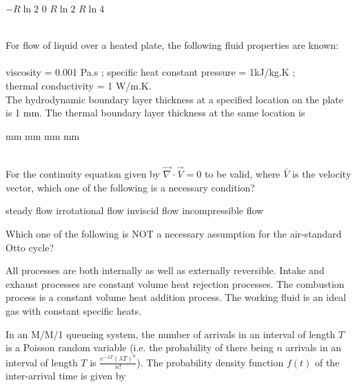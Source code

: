 \documentclass[addpoints,11pt]{exam}
\begin{document}
\begin{questions}
    \begin{oneparchoices}
        \choice $-R \ln2$
        \choice $0$
        \choice $R \ln 2$
        \choice $R\ln4$
    \end{oneparchoices}\\

    \question For flow of liquid over a heated plate, the following fluid properties are known:\\\\
    viscosity = 0.001 Pa.s ; specific heat constant pressure = 1kJ/kg.K ;\\
    thermal conductivity = 1 W/m.K.\\
    The hydrodynamic boundary layer thickness at a specified location on the plate is 1 mm. The thermal boundary layer thickness at the same location is

    \begin{oneparchoices}
         mm
         mm
         mm
         mm
    \end{oneparchoices}\\

    \question For the continuity equation given by $\overrightarrow{\nabla}\cdot\overrightarrow{V} = 0$ to be valid, where $\bar{V}$ is the velocity vector, which one of the following is a necessary condition?\\

    \begin{choices}
        \choice steady flow
        \choice irrotational flow
        \choice inviscid flow
        \choice incompressible flow
    \end{choices}

    \question Which one of the following is NOT a necessary assumption for the air-standard Otto cycle?\\

    \begin{choices}
        \choice All processes are both internally as well as externally reversible.
        \choice Intake and exhaust processes are constant volume heat rejection processes.
        \choice The combustion process is a constant volume heat addition process.
        \choice The working fluid is an ideal gas with constant specific heats.
    \end{choices}

    \question In an M/M/1 queueing system, the number of arrivals in an interval of length $T$ is a Poisson random variable (i.e. the probability of there being $n$ arrivals in an interval of length $T$ is $\frac{e^{-\lambda T}(\lambda T)^n}{n!}$). The probability density function $f(t)$ of the inter-arrival time is given by\\


\end{questions}
\end{document}
